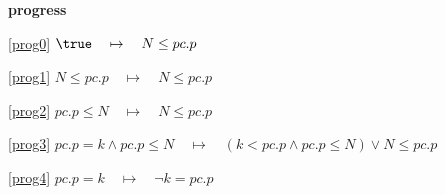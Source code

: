 \textbf{progress}
\begin{block}
\item[ \eqref{prog0} ]$\true \quad \mapsto\quad N \le pc.p$ %
\item[ \eqref{prog1} ]$N \le pc.p \quad \mapsto\quad N \le pc.p$ %
\item[ \eqref{prog2} ]$pc.p \le N \quad \mapsto\quad N \le pc.p$ %
\item[ \eqref{prog3} ]$pc.p = k \land pc.p \le N \quad \mapsto\quad (k < pc.p \land pc.p \le N) \lor N \le pc.p$ %
\item[ \eqref{prog4} ]$pc.p = k  \quad \mapsto\quad \neg k = pc.p$ %
\end{block}
